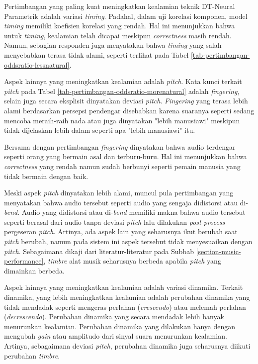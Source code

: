 Pertimbangan yang paling kuat meningkatkan kealamian teknik DT-Neural Parametrik adalah variasi \textit{timing}. Padahal, dalam uji korelasi komponen, model \textit{timing} memiliki koefisien korelasi yang rendah. Hal ini menunjukkan bahwa untuk \textit{timing}, kealamian telah dicapai meskipun \textit{correctness} masih rendah. Namun, sebagian responden juga menyatakan bahwa \textit{timing} yang salah menyebabkan terasa tidak alami, seperti terlihat pada Tabel \ref{tab-pertimbangan-oddsratio-lessnatural}.

Aspek lainnya yang meningkatkan kealamian adalah \textit{pitch}. Kata kunci terkait \textit{pitch} pada Tabel \ref{tab-pertimbangan-oddsratio-morenatural} adalah \textit{fingering}, selain juga secara eksplisit dinyatakan deviasi \textit{pitch}. \textit{Fingering} yang terasa lebih alami berdasarkan persepsi pendengar disebabkan karena suaranya seperti sedang mencoba meraih-raih nada atau juga dinyatakan "lebih manusiawi" meskipun tidak dijelaskan lebih dalam seperti apa "lebih manusiawi" itu.

Bersama dengan pertimbangan \textit{fingering} dinyatakan bahwa audio terdengar seperti orang yang bermain asal dan terburu-buru. Hal ini menunjukkan bahwa \textit{correctness} yang rendah namun sudah berbunyi seperti pemain manusia yang tidak bermain dengan baik.

Meski aspek \textit{pitch} dinyatakan lebih alami, muncul pula pertimbangan yang menyatakan bahwa audio tersebut seperti audio yang sengaja didistorsi atau di-\textit{bend}. Audio yang didistorsi atau di-\textit{bend} memiliki makna bahwa audio tersebut seperti berasal dari audio tanpa deviasi \textit{pitch} lalu dilakukan \textit{post-process} pergeseran \textit{pitch}. Artinya, ada aspek lain yang seharusnya ikut berubah saat \textit{pitch} berubah, namun pada sistem ini aspek tersebut tidak menyesuaikan dengan \textit{pitch}. Sebagaimana dikaji dari literatur-literatur pada Subbab \ref{section-music-performance}, \textit{timbre} alat musik seharusnya berbeda apabila \textit{pitch} yang dimainkan berbeda.

Aspek lainnya yang meningkatkan kealamian adalah variasi dinamika. Terkait dinamika, yang lebih meningkatkan kealamian adalah perubahan dinamika yang tidak mendadak seperti mengeras perlahan (\textit{crescendo}) atau melemah perlahan (\textit{decrescendo}). Perubahan dinamika yang secara mendadak lebih banyak menurunkan kealamian. Perubahan dinamika yang dilakukan hanya dengan mengubah \textit{gain} atau amplitudo dari sinyal suara menurunkan kealamian. Artinya, sebagaimana deviasi \textit{pitch}, perubahan dinamika juga seharusnya diikuti perubahan \textit{timbre}.

